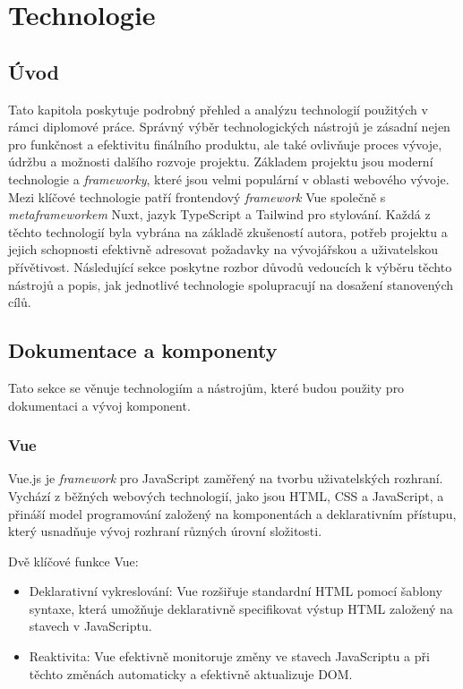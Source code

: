 
\chapter{Technologie}
\label{chap:technologie}

\section{Úvod}
Tato kapitola poskytuje podrobný přehled a analýzu technologií použitých v rámci diplomové práce. Správný výběr technologických nástrojů je zásadní nejen pro funkčnost a efektivitu finálního produktu, ale také ovlivňuje proces vývoje, údržbu a možnosti dalšího rozvoje projektu. Základem projektu jsou moderní technologie a \emph{frameworky}, které jsou velmi populární v oblasti webového vývoje. Mezi klíčové technologie patří frontendový \emph{framework} Vue společně s \emph{metaframeworkem} Nuxt, jazyk TypeScript a Tailwind pro stylování. Každá z těchto technologií byla vybrána na základě zkušeností autora, potřeb projektu a jejich schopnosti efektivně adresovat požadavky na vývojářskou a uživatelskou přívětivost. Následující sekce poskytne rozbor důvodů vedoucích k výběru těchto nástrojů a popis, jak jednotlivé technologie spolupracují na dosažení stanovených cílů.

\section{Dokumentace a komponenty}
Tato sekce se věnuje technologiím a nástrojům, které budou použity pro dokumentaci a vývoj komponent.

\subsection{Vue}
Vue.js je \emph{framework} pro JavaScript zaměřený na tvorbu uživatelských rozhraní. Vychází z běžných webových technologií, jako jsou HTML, CSS a JavaScript, a přináší model programování založený na komponentách a deklarativním přístupu, který usnadňuje vývoj rozhraní různých úrovní složitosti.

Dvě klíčové funkce Vue:

\begin{itemize}
  \item Deklarativní vykreslování: Vue rozšiřuje standardní HTML pomocí šablony syntaxe, která umožňuje deklarativně specifikovat výstup HTML založený na stavech v JavaScriptu.
  \item Reaktivita: Vue efektivně monitoruje změny ve stavech JavaScriptu a při těchto změnách automaticky a efektivně aktualizuje DOM. \cite{WhatIsVue}
\end{itemize}

